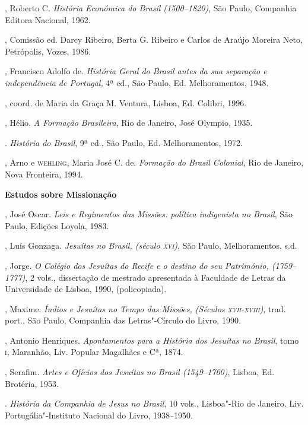 \begin{bibliohedra}
, Roberto C. \textit{História Económica do Brasil
(1500--1820)}, São Paulo, Companhia Editora Nacional, 1962.

, Comissão ed. Darcy Ribeiro, Berta
G. Ribeiro e Carlos de Araújo Moreira Neto, Petrópolis, Vozes, 1986.

, Francisco Adolfo de. \textit{História Geral do Brasil antes
da sua separação e independência de Portugal, } 4ª ed., São Paulo, Ed.
Melhoramentos, 1948.

, coord. de
Maria da Graça M. Ventura, Lisboa, Ed. Colibri, 1996.

, Hélio. \textit{A Formação Brasileira}, Rio de Janeiro, José
Olympio, 1935.

\titidem. \textit{História do Brasil}, 9ª ed., São Paulo, Ed.
Melhoramentos, 1972.

, Arno e \textsc{wehling}, Maria José C. de. \textit{Formação do Brasil
Colonial}, Rio de Janeiro, Nova Fronteira, 1994. 

\vspace*{2ex}
\scriptsize\textbf{Estudos sobre Missionação}

, José Oscar. \textit{Leis e Regimentos das Missões: política
indigenista no Brasil}, São Paulo, Edições Loyola, 1983.

, Luís Gonzaga. \textit{Jesuítas no Brasil, (século \textsc{xvi})}, São
Paulo, Melhoramentos, s.d.

, Jorge. \textit{O Colégio dos Jesuítas do Recife e o destino do
seu Património, (1759--1777)}, 2 vols., dissertação de mestrado
apresentada à Faculdade de Letras da Universidade de Lisboa, 1990, (policopiada).

, Maxime. \textit{Índios e Jesuítas no Tempo das Missões,
(Séculos \textsc{xvii}-\textsc{xviii})}, trad. port., São Paulo, Companhia das
Letras"-Círculo do Livro, 1990.

, Antonio Henriques. \textit{Apontamentos para a História dos
Jesuítas no Brasil}, tomo \textsc{i}, Maranhão, Liv. Popular Magalhães e Cª,
1874.

, Serafim. \textit{Artes e Ofícios dos Jesuítas no Brasil
(1549--1760)}, Lisboa, Ed. Brotéria, 1953.

\titidem. \textit{História da Companhia de Jesus no Brasil}, 10
vols., Lisboa"-Rio de Janeiro, Liv. Portugália"-Instituto Nacional do
Livro, 1938--1950.


\end{bibliohedra}
